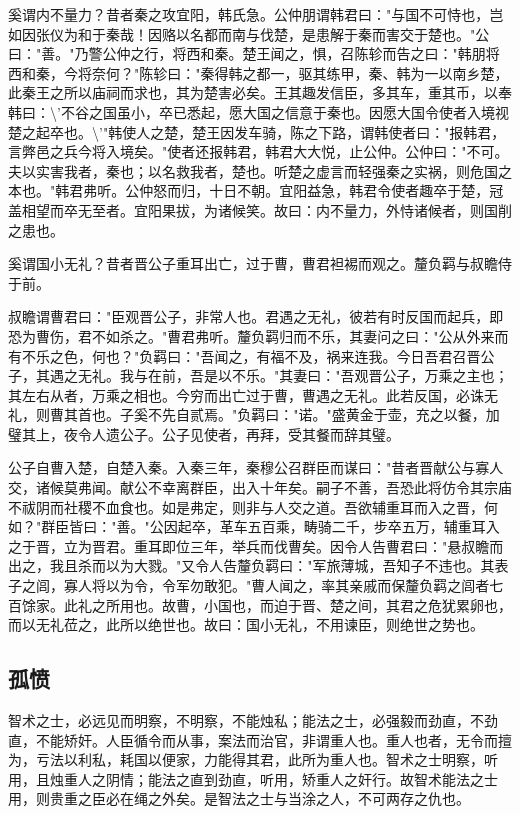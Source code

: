 \documentclass[]{article}
\begin{document}
奚谓内不量力？昔者秦之攻宜阳，韩氏急。公仲朋谓韩君曰："与国不可恃也，岂如因张仪为和于秦哉！因赂以名都而南与伐楚，是患解于秦而害交于楚也。"公曰："善。"乃警公仲之行，将西和秦。楚王闻之，惧，召陈轸而告之曰："韩朋将西和秦，今将奈何？"陈轸曰："秦得韩之都一，驱其练甲，秦、韩为一以南乡楚，此秦王之所以庙祠而求也，其为楚害必矣。王其趣发信臣，多其车，重其币，以奉韩曰：\textbackslash{}'不谷之国虽小，卒已悉起，愿大国之信意于秦也。因愿大国令使者入境视楚之起卒也。\textbackslash{}'"韩使人之楚，楚王因发车骑，陈之下路，谓韩使者曰："报韩君，言弊邑之兵今将入境矣。"使者还报韩君，韩君大大悦，止公仲。公仲曰："不可。夫以实害我者，秦也；以名救我者，楚也。听楚之虚言而轻强秦之实祸，则危国之本也。"韩君弗听。公仲怒而归，十日不朝。宜阳益急，韩君令使者趣卒于楚，冠盖相望而卒无至者。宜阳果拔，为诸候笑。故曰：内不量力，外恃诸候者，则国削之患也。

奚谓国小无礼？昔者晋公子重耳出亡，过于曹，曹君袒裼而观之。釐负羁与叔瞻侍于前。

叔瞻谓曹君曰："臣观晋公子，非常人也。君遇之无礼，彼若有时反国而起兵，即恐为曹伤，君不如杀之。"曹君弗听。釐负羁归而不乐，其妻问之曰："公从外来而有不乐之色，何也？"负羁曰："吾闻之，有福不及，祸来连我。今日吾君召晋公子，其遇之无礼。我与在前，吾是以不乐。"其妻曰："吾观晋公子，万乘之主也；其左右从者，万乘之相也。今穷而出亡过于曹，曹遇之无礼。此若反国，必诛无礼，则曹其首也。子奚不先自贰焉。"负羁曰："诺。"盛黄金于壶，充之以餐，加璧其上，夜令人遗公子。公子见使者，再拜，受其餐而辞其璧。

公子自曹入楚，自楚入秦。入秦三年，秦穆公召群臣而谋曰："昔者晋献公与寡人交，诸候莫弗闻。献公不幸离群臣，出入十年矣。嗣子不善，吾恐此将仿令其宗庙不祓阴而社稷不血食也。如是弗定，则非与人交之道。吾欲辅重耳而入之晋，何如？"群臣皆曰："善。"公因起卒，革车五百乘，畴骑二千，步卒五万，辅重耳入之于晋，立为晋君。重耳即位三年，举兵而伐曹矣。因令人告曹君曰："悬叔瞻而出之，我且杀而以为大戮。"又令人告釐负羁曰："军旅薄城，吾知子不违也。其表子之闾，寡人将以为令，令军勿敢犯。"曹人闻之，率其亲戚而保釐负羁之闾者七百馀家。此礼之所用也。故曹，小国也，而迫于晋、楚之间，其君之危犹累卵也，而以无礼莅之，此所以绝世也。故曰：国小无礼，不用谏臣，则绝世之势也。

\hypertarget{header-n882}{%
\subsection{孤愤}\label{header-n882}}

智术之士，必远见而明察，不明察，不能烛私；能法之士，必强毅而劲直，不劲直，不能矫奸。人臣循令而从事，案法而治官，非谓重人也。重人也者，无令而擅为，亏法以利私，耗国以便家，力能得其君，此所为重人也。智术之士明察，听用，且烛重人之阴情；能法之直到劲直，听用，矫重人之奸行。故智术能法之士用，则贵重之臣必在绳之外矣。是智法之士与当涂之人，不可两存之仇也。
\end{document}
